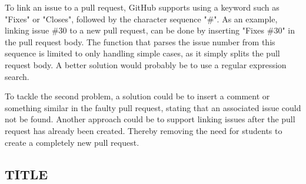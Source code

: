 To link an issue to a pull request, GitHub supports using a keyword such as "Fixes" or "Closes", followed by the character sequence "\#<issue number>".
As an example, linking issue \#30 to a new pull request, can be done by inserting "Fixes \#30" in the pull request body.
The function that parses the issue number from this sequence is limited to only handling simple cases, as it simply splits the pull request body.
A better solution would probably be to use a regular expression search.

To tackle the second problem, a solution could be to insert a comment or something similar in the faulty pull request, stating that an associated issue could not be found.
Another approach could be to support linking issues after the pull request has already been created.
Thereby removing the need for students to create a completely new pull request.

\subsection{TITLE}

